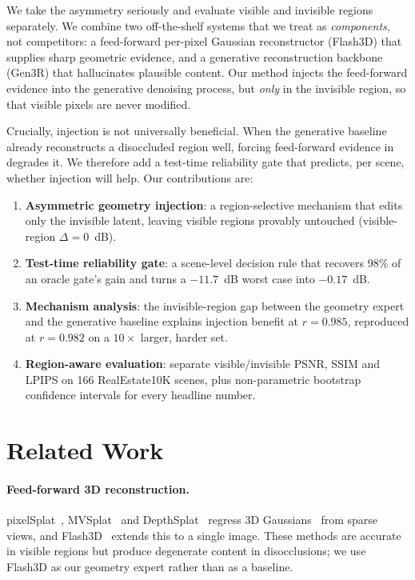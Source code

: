 \documentclass[10pt,twocolumn,letterpaper]{article}
\begin{document}
We take the asymmetry seriously and evaluate visible and invisible regions
separately. We combine two off-the-shelf systems that we treat as
\emph{components}, not competitors: a feed-forward per-pixel Gaussian
reconstructor (Flash3D) that supplies sharp geometric evidence, and a generative
reconstruction backbone (Gen3R) that hallucinates plausible content. Our method
injects the feed-forward evidence into the generative denoising process, but
\emph{only} in the invisible region, so that visible pixels are never modified.

Crucially, injection is not universally beneficial. When the generative baseline
already reconstructs a disoccluded region well, forcing feed-forward evidence in
degrades it. We therefore add a test-time reliability gate that predicts, per
scene, whether injection will help. Our contributions are:

\begin{enumerate}
\item \textbf{Asymmetric geometry injection}: a region-selective mechanism that
edits only the invisible latent, leaving visible regions provably untouched
(visible-region $\Delta=0$~dB).
\item \textbf{Test-time reliability gate}: a scene-level decision rule that
recovers 98\% of an oracle gate's gain and turns a $-11.7$~dB worst case into
$-0.17$~dB.
\item \textbf{Mechanism analysis}: the invisible-region gap between the geometry
expert and the generative baseline explains injection benefit at $r=0.985$,
reproduced at $r=0.982$ on a $10\times$ larger, harder set.
\item \textbf{Region-aware evaluation}: separate visible/invisible PSNR, SSIM
and LPIPS on 166 RealEstate10K scenes, plus non-parametric bootstrap confidence
intervals for every headline number.
\end{enumerate}

\section{Related Work}
\label{sec:related}

\paragraph{Feed-forward 3D reconstruction.}
pixelSplat~\cite{pixelsplat}, MVSplat~\cite{mvsplat} and
DepthSplat~\cite{depthsplat} regress 3D Gaussians~\cite{gaussiansplatting} from
sparse views, and Flash3D~\cite{flash3d} extends this to a single image. These
methods are accurate in visible regions but produce degenerate content in
disocclusions; we use Flash3D as our geometry expert rather than as a baseline.
\end{document}
